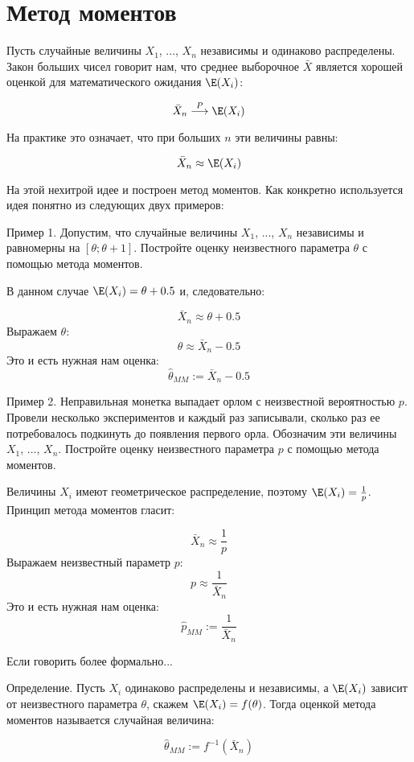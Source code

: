 
\section{Метод моментов}


Пусть случайные величины $X_{1}$, ..., $X_{n}$ независимы и одинаково распределены. Закон больших чисел говорит нам, что среднее выборочное $ \bar{X} $ является хорошей оценкой для математического ожидания $ \E(X_{i}) $:

\[ \bar{X}_{n} \stackrel{P}{\longrightarrow} \E(X_{i}) \]

На практике это означает, что при больших $ n $ эти величины равны:

\[ \bar{X}_{n}\approx \E(X_{i}) \]

На этой нехитрой идее и построен метод моментов. Как конкретно используется идея понятно из следующих двух примеров:

Пример 1. Допустим, что случайные величины $ X_{1} $, ..., $ X_{n} $ независимы и равномерны на $ [\theta;\theta+1] $. Постройте оценку неизвестного параметра $ \theta $ с помощью метода моментов.

В данном случае $ \E(X_{i})=\theta+0.5 $ и, следовательно:

\[ \bar{X}_{n}\approx \theta+0.5 \]
Выражаем $ \theta $:
\[ \theta\approx \bar{X}_{n}-0.5 \]
Это и есть нужная нам оценка:
\[ \hat{\theta}_{MM}:=\bar{X}_{n}-0.5 \]


Пример 2. Неправильная монетка выпадает орлом с неизвестной вероятностью $ p $. Провели несколько экспериментов и каждый раз записывали, сколько раз ее потребовалось подкинуть до появления первого орла. Обозначим эти величины $X_{1}$, ..., $ X_{n} $. Постройте оценку неизвестного параметра $ p $ с помощью метода моментов.

Величины $ X_{i} $ имеют геометрическое распределение, поэтому $ \E(X_{i})=\frac{1}{p} $. Принцип метода моментов гласит:

\[ \bar{X}_{n}\approx \frac{1}{p}\]
Выражаем неизвестный параметр $ p $:
\[ p\approx \frac{1}{\bar{X}_{n}} \]
Это и есть нужная нам оценка:
\[ \hat{p}_{MM}:= \frac{1}{\bar{X}_{n}} \]


Если говорить более формально...

Определение. Пусть $ X_{i} $ одинаково распределены и независимы, а $ \E(X_{i}) $ зависит от неизвестного параметра $ \theta $, скажем $ \E(X_{i})=f(\theta) $. Тогда оценкой метода моментов называется случайная величина:

\[ \hat{\theta}_{MM}:=f^{-1}(\bar{X}_{n}) \]

